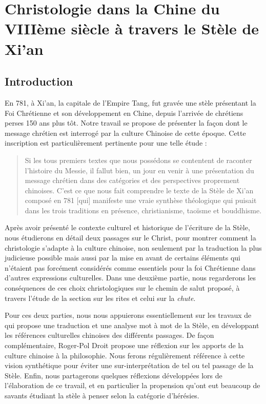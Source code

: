 \chapter{Christologie dans la Chine du VIIIème siècle à travers le Stèle de Xi'an}
\label{ch:christologieChine}
\section{Introduction}

En 781, à Xi'an, la capitale de l'Empire Tang, fut gravée une stèle présentant la Foi Chrétienne et son développement en Chine, depuis l'arrivée de chrétiens perses 150 ans plus tôt. Notre travail se propose de présenter la façon dont le message chrétien est interrogé par la culture Chinoise de cette époque. Cette inscription est particulièrement pertinente pour une telle étude : 

\begin{quote}
Si les tous premiers textes que nous possédons se contentent de raconter l'histoire du Messie, il fallut bien, un jour en venir à une présentation du message chrétien dans des catégories et des perspectives proprement chinoises. C'est ce que nous fait comprendre le texte de la Stèle de Xi'an composé en 781 [qui] manifeste une vraie synthèse théologique qui puisait dans les trois traditions en présence, christianisme, taoïsme et bouddhisme. \cite[p.~150]{Raguin:JesusMessieXian} 
\end{quote}

Après avoir présenté le contexte culturel et historique de l'écriture de la Stèle, nous étudierons en détail deux passages sur le Christ, pour montrer comment la christologie s'adapte à la culture chinoise, non seulement par la traduction la plus judicieuse possible mais aussi par la mise en avant de certains éléments qui n'étaient pas forcément considérés comme essentiels pour la foi Chrétienne dans d'autres expressions culturelles.
Dans une deuxième partie, nous regarderons les conséquences de ces choix christologiques sur le chemin de salut proposé, à travers l'étude de la section sur les rites et celui sur la \textit{chute}. 

Pour ces deux parties, nous nous appuierons essentiellement sur les travaux de \cite{Havret:stelechretienne} qui propose une traduction et une analyse mot à mot de la Stèle, en développant les références culturelles chinoises des différents passages. De façon complémentaire, Roger-Pol Droit \citep{PolDroit:voyage} propose une réflexion sur les apports de la culture chinoise à la philosophie. Nous ferons régulièrement référence à cette vision synthétique pour éviter une sur-interprétation de tel ou tel passage de la Stèle. 
Enfin, nous partagerons quelques réflexions développées lors de l'élaboration de ce travail, et en particulier la propension qu'ont eut beaucoup de savants étudiant la stèle à penser selon la catégorie d'hérésies.


